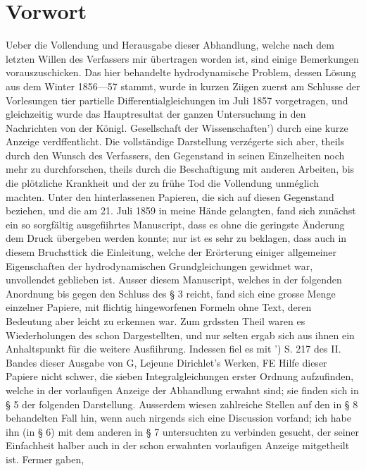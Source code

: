 \documentclass[11pt]{article}
\begin{document}
\section*{Vorwort}
Ueber die Vollendung und Herausgabe dieser Abhandlung, welche nach dem letzten Willen
des Verfassers mir übertragen worden ist, sind einige Bemerkungen vorauszuschicken.
Das hier behandelte hydrodynamische Problem, dessen Lösung aus dem Winter 1856—57
stammt, wurde in kurzen Ziigen zuerst am Schlusse der Vorlesungen tier partielle Differentialgleichungen im Juli 1857 vorgetragen, und gleichzeitig wurde das Hauptresultat
der ganzen Untersuchung in den Nachrichten von der Königl. Gesellschaft der Wissenschaften’) durch eine kurze Anzeige verdffentlicht. Die vollständige Darstellung verzégerte
sich aber, theils durch den Wunsch des Verfassers, den Gegenstand in seinen Einzelheiten noch mehr zu durchforschen, theils durch die Beschaftigung mit anderen Arbeiten,
bis die plötzliche Krankheit und der zu frühe Tod die Vollendung unméglich machten.
Unter den hinterlassenen Papieren, die sich auf diesen Gegenstand beziehen, und die am
21. Juli 1859 in meine Hände gelangten, fand sich zunächst ein so sorgfältig ausgefiihrtes
Manuscript, dass es ohne die geringste Änderung dem Druck übergeben werden konnte;
nur ist es sehr zu beklagen, dass auch in diesem Bruchsttick die Einleitung, welche der
Erörterung einiger allgemeiner Eigenschaften der hydrodynamischen Grundgleichungen
gewidmet war, unvollendet geblieben ist. Ausser diesem Manuscript, welches in der folgenden Anordnung bis gegen den Schluss des § 3 reicht, fand sich eine grosse Menge einzelner
Papiere, mit flichtig hingeworfenen Formeln ohne Text, deren Bedeutung aber leicht zu
erkennen war. Zum grdssten Theil waren es Wiederholungen des schon Dargestellten, und
nur selten ergab sich aus ihnen ein Anhaltspunkt für die weitere Ausfiihrung. Indessen fiel
es mit ’) S. 217 des II. Bandes dieser Ausgabe von G, Lejeune Dirichlet’s Werken, FE
Hilfe dieser Papiere nicht schwer, die sieben Integralgleichungen erster Ordnung aufzufinden, welche in der vorlaufigen Anzeige der Abhandlung erwahnt sind; sie finden sich
in § 5 der folgenden Darstellung. Ausserdem wiesen zahlreiche Stellen auf den in § 8
behandelten Fall hin, wenn auch nirgends sich eine Discussion vorfand; ich habe ihn (in
§ 6) mit dem anderen in § 7 untersuchten zu verbinden gesucht, der seiner Einfachheit
halber auch in der schon erwahnten vorlaufigen Anzeige mitgetheilt ist. Fermer gaben,
\end{document}
